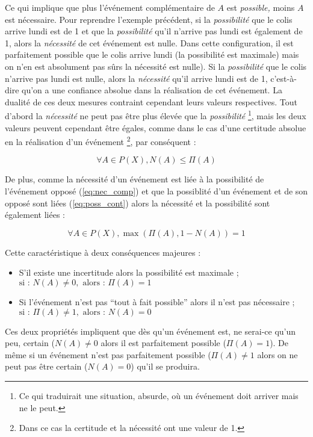 {Ce qui implique que plus l'événement complémentaire de \(A\) est
\emph{possible,} moins \(A\) est nécessaire. Pour reprendre l'exemple
précédent, si la \emph{possibilité} que le colis arrive lundi est de 1
et que la \emph{possibilité} qu'il n'arrive pas lundi est également de
1, alors la \emph{nécessité} de cet événement est nulle. Dans cette
configuration, il est parfaitement possible que le colis arrive lundi
(la possibilité est maximale) mais on n'en est absolument pas sûrs la
nécessité est nulle). Si la \emph{possibilité} que le colis n'arrive
pas lundi est nulle, alors la \emph{nécessité} qu'il arrive lundi est
de 1, c'est-à-dire qu'on a une confiance absolue dans la réalisation
de cet événement. La dualité de ces deux mesures contraint cependant
leurs valeurs respectives. Tout d'abord la \emph{nécessité} ne peut
pas être plus élevée que la \emph{possibilité} \footnote{Ce qui
  traduirait une situation, absurde, où un événement doit arriver mais
  ne le peut.}, mais les deux valeurs peuvent cependant être égales,
comme dans le cas d'une certitude absolue en la réalisation d'un
événement \footnote{Dans ce cas la certitude et la nécessité ont une
  valeur de 1.}, par conséquent :

\begin{equation}
  \forall A \in P(X), N(A) ≤ \Pi(A)
\end{equation}

De plus, comme la nécessité d'un événement est liée à la possibilité
de l'événement opposé (\autoref{eq:nec_comp}) et que la possiblité
d'un événement et de son opposé sont liées (\autoref{eq:poss_cont})
alors la nécessité et la possibilité sont également liées :

\begin{equation}
  \forall A \in P(X), \max(\Pi(A), 1-N(A)) = 1
\end{equation}

Cette caractéristique à deux conséquences majeures :

\begin{itemize}
\item S'il existe une incertitude alors la possibilité est maximale ;
  \(\text{si : } N(A) ≠ 0, \text{ alors : } Π(A)=1\)
\item Si l'événement n'est pas \enquote{tout à fait possible} alors il
  n'est pas nécessaire ;
  \(\text{si : } Π(A) ≠ 1, \text{ alors : } N(A)=0\)
\end{itemize}

Ces deux propriétés impliquent que dès qu'un événement est, ne
serai-ce qu'un peu, certain (\(N(A) ≠ 0\) alors il est parfaitement
possible (\(Π(A)=1\)). De même si un événement n'est pas parfaitement
possible (\(Π(A) ≠ 1\) alors on ne peut pas être certain
(\(N(A) = 0\)) qu'il se produira.

}
